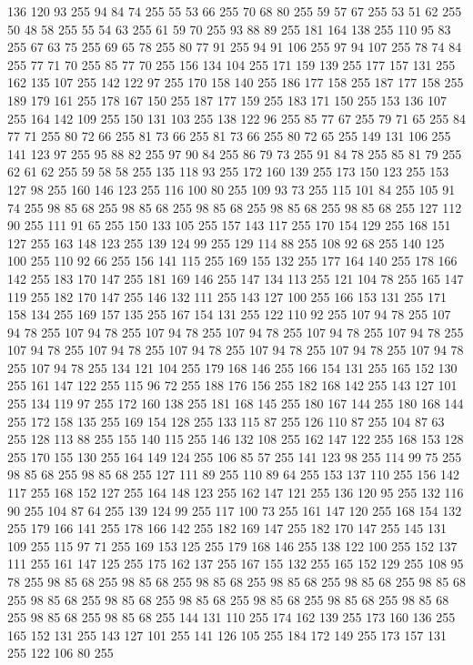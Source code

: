 136 120 93 255 94 84 74 255 55 53 66 255 70 68 80 255 59 57 67 255 53 51 62 255 50 48 58 255 55 54 63 255 61 59 70 255 93 88 89 255 181 164 138 255 110 95 83 255 67 63 75 255 69 65 78 255 80 77 91 255 94 91 106 255 97 94 107 255 78 74 84 255 77 71 70 255 85 77 70 255 156 134 104 255 171 159 139 255 177 157 131 255 162 135 107 255 142 122 97 255 170 158 140 255 186 177 158 255 187 177 158 255 189 179 161 255 178 167 150 255 187 177 159 255 183 171 150 255 153 136 107 255 164 142 109 255 150 131 103 255 138 122 96 255 85 77 67 255 79 71 65 255 84 77 71 255 80 72 66 255 81 73 66 255 81 73 66 255 80 72 65 255 149 131 106 255 141 123 97 255 95 88 82 255 97 90 84 255 86 79 73 255 91 84 78 255 85 81 79 255 62 61 62 255 59 58 58 255 135 118 93 255 172 160 139 255 173 150 123 255 153 127 98 255 160 146 123 255 116 100 80 255 109 93 73 255 115 101 84 255 105 91 74 255 98 85 68 255 98 85 68 255 98 85 68 255
98 85 68 255 98 85 68 255 127 112 90 255 111 91 65 255 150 133 105 255 157 143 117 255 170 154 129 255 168 151 127 255 163 148 123 255 139 124 99 255 129 114 88 255 108 92 68 255 140 125 100 255 110 92 66 255 156 141 115 255 169 155 132 255 177 164 140 255 178 166 142 255 183 170 147 255 181 169 146 255 147 134 113 255 121 104 78 255 165 147 119 255 182 170 147 255 146 132 111 255 143 127 100 255 166 153 131 255 171 158 134 255 169 157 135 255 167 154 131 255 122 110 92 255 107 94 78 255 107 94 78 255 107 94 78 255 107 94 78 255 107 94 78 255 107 94 78 255 107 94 78 255 107 94 78 255 107 94 78 255 107 94 78 255 107 94 78 255 107 94 78 255 107 94 78 255 107 94 78 255 134 121 104 255 179 168 146 255 166 154 131 255 165 152 130 255 161 147 122 255 115 96 72 255 188 176 156 255 182 168 142 255 143 127 101 255 134 119 97 255 172 160 138 255 181 168 145 255 180 167 144 255 180 168 144 255 172 158 135 255 169 154 128 255 133 115 87 255 126 110 87 255 104 87 63 255
128 113 88 255 155 140 115 255 146 132 108 255 162 147 122 255 168 153 128 255 170 155 130 255 164 149 124 255 106 85 57 255 141 123 98 255 114 99 75 255 98 85 68 255 98 85 68 255 127 111 89 255 110 89 64 255 153 137 110 255 156 142 117 255 168 152 127 255 164 148 123 255 162 147 121 255 136 120 95 255 132 116 90 255 104 87 64 255 139 124 99 255 117 100 73 255 161 147 120 255 168 154 132 255 179 166 141 255 178 166 142 255 182 169 147 255 182 170 147 255 145 131 109 255 115 97 71 255 169 153 125 255 179 168 146 255 138 122 100 255 152 137 111 255 161 147 125 255 175 162 137 255 167 155 132 255 165 152 129 255 108 95 78 255 98 85 68 255 98 85 68 255 98 85 68 255 98 85 68 255 98 85 68 255 98 85 68 255 98 85 68 255 98 85 68 255 98 85 68 255 98 85 68 255 98 85 68 255 98 85 68 255 98 85 68 255 98 85 68 255 144 131 110 255 174 162 139 255 173 160 136 255 165 152 131 255 143 127 101 255 141 126 105 255 184 172 149 255 173 157 131 255 122 106 80 255

